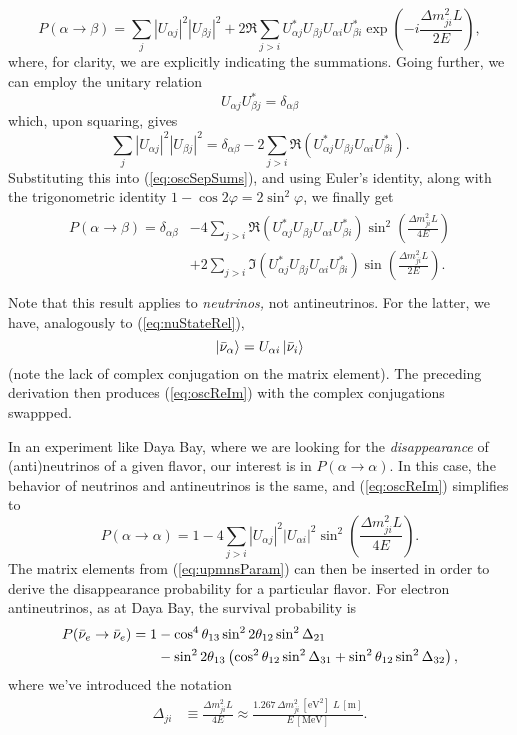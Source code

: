 \documentclass[../thesis.tex]{subfiles}
\begin{document}
\begin{equation}
  \label{eq:oscSepSums}
P(\alpha \rightarrow \beta) = \sum_{j} |U_{\alpha j}|^2 |U_{\beta j}|^2
  + 2 \Re \sum_{j>i} U^*_{\alpha j} U_{\beta j} U_{\alpha i} U^*_{\beta i}
  \exp\left( -i \frac{\Delta m^2_{ji}L}{2E} \right),
\end{equation}
where, for clarity, we are explicitly indicating the summations. Going further, we can employ the unitary relation
\[U_{\alpha j} U^*_{\beta j} = \delta_{\alpha \beta}\]
which, upon squaring, gives
\[ \sum_j |U_{\alpha j}|^2 |U_{\beta j}|^2 = \delta_{\alpha \beta} -
  2 \sum_{j > i} \Re(U^*_{\alpha j} U_{\beta j} U_{\alpha i} U^*_{\beta i}).\]
Substituting this into (\ref{eq:oscSepSums}), and using Euler's identity, along with the trigonometric identity $1 - \cos 2\varphi = 2\sin^2 \varphi$, we finally get
\begin{align}
  \label{eq:oscReIm}
  \begin{split}
    P(\alpha \rightarrow \beta) = \delta_{\alpha \beta}
    &- 4\sum_{j > i} \Re(U^*_{\alpha j} U_{\beta j} U_{\alpha i} U^*_{\beta i})
    \sin^2 \left( \frac{\Delta m^2_{ji}L}{4E} \right) \\
    &+ 2\sum_{j > i} \Im(U^*_{\alpha j} U_{\beta j} U_{\alpha i} U^*_{\beta i})
    \sin \left( \frac{\Delta m^2_{ji}L}{2E} \right). \\
  \end{split}
\end{align}
Note that this result applies to \emph{neutrinos,} not antineutrinos. For the latter, we have, analogously to (\ref{eq:nuStateRel}),
\[\ket{\bar\nu_\alpha} = U_{\alpha i}\ket{\bar\nu_i}\]
(note the lack of complex conjugation on the matrix element). The preceding derivation then produces (\ref{eq:oscReIm}) with the complex conjugations swappped.

In an experiment like Daya Bay, where we are looking for the \emph{disappearance} of (anti)neutrinos of a given flavor, our interest is in $P(\alpha \rightarrow \alpha)$. In this case, the behavior of neutrinos and antineutrinos is the same, and (\ref{eq:oscReIm}) simplifies to
\[P(\alpha \rightarrow \alpha) = 1 - 4 \sum_{j>i} |U_{\alpha j}|^2 |U_{\alpha i}|^2
\sin^2\left( \frac{\Delta m^2_{ji} L}{4E} \right). \]
The matrix elements from (\ref{eq:upmnsParam}) can then be inserted in order to derive the disappearance probability for a particular flavor. For electron antineutrinos, as at Daya Bay, the survival probability is
\begin{align}
  \label{eq:survProbDybFull}
  \begin{split}
    P(\bar\nu_e \rightarrow \bar\nu_e) =
    1 &- \cos^4\theta_{13}\sin^2 2\theta_{12} \sin^2 \Delta_{21} \\
    &- \sin^2 2\theta_{13}\left( \cos^2\theta_{12} \sin^2 \Delta_{31}
    + \sin^2\theta_{12} \sin^2 \Delta_{32}\right),
  \end{split}
\end{align}
where we've introduced the notation
\begin{align}
  \Delta_{ji} &\equiv \frac{\Delta m^2_{ji}L}{4E}
                \approx \frac{1.267\, \Delta m^2_{ji}\,\mathrm{[eV^2]}\;
                L\,\mathrm{[m]}}{E\,\mathrm{[MeV]}}.
\end{align}
\end{document}
